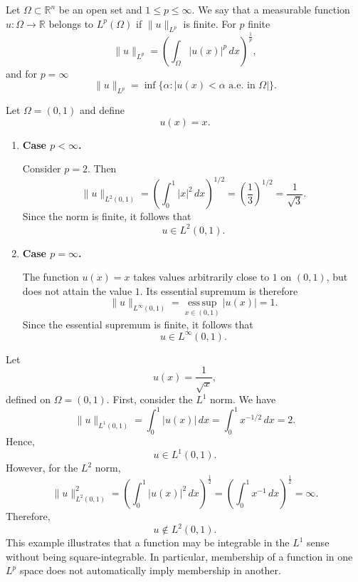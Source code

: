 \begin{definition}
    \label{def:L^P Space}
    Let $\Omega \subset \mathbb{R}^n$ be an open set and $1 \le p \le \infty$.  We say that a measurable function $u : \Omega \rightarrow \mathbb{R}$ belongs to $L^p(\Omega)$ if $\|u\|_{L^p}$ is finite. For $p$ finite
    \[
    \|u\|_{L^p} = \left(\int_\Omega |u(x)|^p \, dx\right)^{\frac{1}{p}},
    \]   
    and for $p = \infty$
    \[
    \|u\|_{L^p} = \inf\{\alpha : |u(x)<\alpha \text{ a.e. in } \Omega|\}.
    \]
\end{definition}

\begin{example}
    \label{ex:Lp-norm}

    Let $\Omega=(0,1)$ and define
    \[
        u(x)=x.
    \]

    \begin{enumerate}
        \item[(i)] \textbf{Case $p<\infty$.}

        Consider $p=2$. Then
        \[
            \|u\|_{L^2(0,1)}
            =
            \left(\int_0^1 |x|^2\,dx\right)^{1/2}
            =
            \left(\frac{1}{3}\right)^{1/2}
            =
            \frac{1}{\sqrt{3}}.
        \]
        Since the norm is finite, it follows that
        \[
            u\in L^2(0,1).
        \]

        \item[(ii)] \textbf{Case $p=\infty$.}

        The function $u(x)=x$ takes values arbitrarily close to $1$ on
        $(0,1)$, but does not attain the value $1$. Its essential
        supremum is therefore
        \[
            \|u\|_{L^\infty(0,1)}
            =
            \operatorname*{ess\,sup}_{x\in(0,1)}|u(x)|
            =
            1.
        \]
        Since the essential supremum is finite, it follows that
        \[
            u\in L^\infty(0,1).
        \]
    \end{enumerate}
\end{example}

\begin{example}
    \label{ex:L1-not-L2}
    Let
    \[
        u(x)=\frac{1}{\sqrt{x}},
    \]
    defined on $\Omega=(0,1)$. First, consider the $L^1$ norm. We have
    \[
        \|u\|_{L^1(0,1)}
        =
        \int_0^1 |u(x)|\,dx
        =
        \int_0^1 x^{-1/2}\,dx
        =
        2.
    \]
    Hence,
    \[
        u\in L^1(0,1).
    \]
    However, for the $L^2$ norm,
    \[
        \|u\|_{L^2(0,1)}^2
        =
        \left(\int_0^1 |u(x)|^2\,dx\right)^\frac{1}2
        =
        \left(\int_0^1 x^{-1}\,dx\right)^\frac{1}2
        =
        \infty.
    \]
    Therefore,
    \[
        u\notin L^2(0,1).
    \]
    This example illustrates that a function may be integrable in the
    $L^1$ sense without being square-integrable. In particular, membership
    of a function in one $L^p$ space does not automatically imply membership
    in another.
\end{example}

